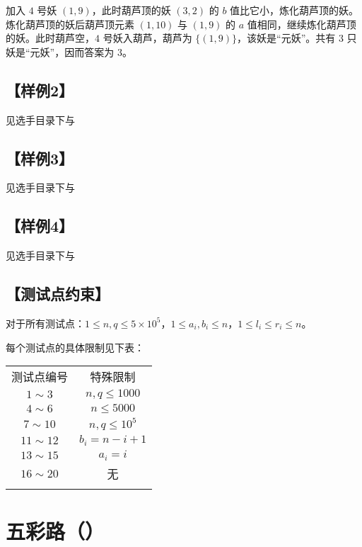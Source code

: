 \documentclass{statement}
\begin{document}
    加入 $4$ 号妖 $(1, 9)$，此时葫芦顶的妖 $(3, 2)$ 的 $b$ 值比它小，炼化葫芦顶的妖。炼化葫芦顶的妖后葫芦顶元素 $(1, 10)$ 与
    $(1, 9)$ 的 $a$ 值相同，继续炼化葫芦顶的妖。此时葫芦空，$4$ 号妖入葫芦，葫芦为 $\{(1, 9)\}$，该妖是“元妖”。共有 $3$ 只妖是“元妖”，因而答案为 $3$。
    \subsection[样例2]{【样例2】}
 	见选手目录下与
    \subsection[样例3]{【样例3】}
	见选手目录下与    
    \subsection[样例4]{【样例4】}
	见选手目录下与
    \subsection[测试点约束]{【测试点约束】}
    对于所有测试点：$1 \leq n, q \leq 5 \times 10^5$，$1 \leq a_i, b_i \leq n$，$1 \leq l_i \leq r_i \leq n$。

    每个测试点的具体限制见下表：
    \begin{center}
        \begin{tabular}{|c|c|}
            \Xhline{5\arrayrulewidth}
            测试点编号 & 特殊限制\\
            \Xhline{3\arrayrulewidth}
            $1 \sim 3$ & $n,q \leq 1000$\\
            \hline
           	$4 \sim 6$ & $n \leq 5000$\\
           	\hline
           	$7 \sim 10$ & $n,q \leq 10^5$\\
           	\hline
           	$11 \sim 12$ & $b_i=n-i+1$\\
           	\hline
           	$13 \sim 15$ & $a_i=i$\\
           	\hline
           	$16 \sim 20$ & 无 \\
            \Xhline{5\arrayrulewidth}
        \end{tabular}
    \end{center}



    \newpage
    
    \section{五彩路（）}
\end{document}
